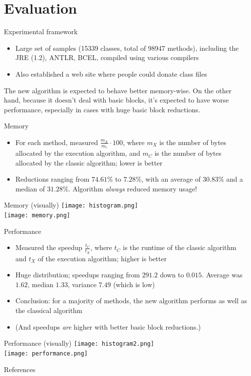\documentclass{beamer}
\begin{document}
\section{Evaluation}

\begin{frame}{Experimental framework}
\begin{itemize}
\item Large set of samples (15339 classes, total of 98947 methods), 
including the JRE (1.2), ANTLR, BCEL, compiled using various compilers
\item Also established a web site where people could donate class files
\end{itemize}
The new algorithm is expected to behave better memory-wise. On the other
hand, because it doesn't deal with basic blocks, it's expected to have
worse performance, especially in cases with huge basic block reductions.
\end{frame}

\begin{frame}{Memory}
\begin{itemize}
\item For each method, measured $\frac{m_X}{m_c} \cdot 100$, where $m_X$ is
the number of bytes allocated by the execution algorithm, and $m_C$ is the
number of bytes allocated by the classic algorithm; lower is better
\item Reductions ranging from $74.61\%$ to $7.28\%$, with an average of
$30.83\%$ and a median of $31.28\%$. Algorithm \emph{always} reduced
memory usage!
\end{itemize}
\end{frame}

\begin{frame}{Memory (visually)}
\texttt{[image: histogram.png]} \\
\texttt{[image: memory.png]}
\end{frame}

\begin{frame}{Performance}
\begin{itemize}
\item Measured the speedup $\frac{t_C}{t_X}$, where $t_C$ is the runtime
of the classic algorithm and $t_X$ of the execution algorithm; higher is
better
\item Huge distribution; speedups ranging from $291.2$ down to $0.015$.
Average was $1.62$, median $1.33$, variance $7.49$ (which is low)
\item Conclusion: for a majority of methods, the new algorithm performs as
well as the classical algorithm
\item (And speedups \emph{are} higher with better basic block reductions.)
\end{itemize}
\end{frame}

\begin{frame}{Performance (visually)}
\texttt{[image: histogram2.png]} \\
\texttt{[image: performance.png]}
\end{frame}

\begin{frame}{References}

{\footnotesize
}
\end{frame}
\end{document}

